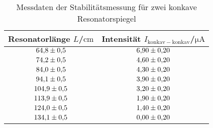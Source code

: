 \begin{table}
 \caption{Messdaten der Stabilitätsmessung für zwei konkave Resonatorspiegel}
 \label{tab:stabilitaetkk}
 \centering
{} \begin{tabular}{SS}
 \toprule 
    {Resonatorlänge $ L$/$\si{\centi\meter}$}& {Intensität $I_{\mathrm{konkav-konkav}}$/$\si{\micro\ampere}$} \\
     \midrule
     $\num{64.8 \pm 0.5}$ & $\num{6.90\pm0.20}$ \\
     $\num{74.2 \pm 0.5}$ & $\num{4.60\pm0.20}$ \\
     $\num{84.0 \pm 0.5}$ & $\num{4.30\pm0.20}$ \\
     $\num{94.1 \pm 0.5}$ & $\num{3.90\pm0.20}$ \\
     $\num{104.9 \pm 0.5}$ & $\num{3.20\pm0.20}$ \\
     $\num{113.9 \pm 0.5}$ & $\num{1.90\pm0.20}$ \\
     $\num{124.0 \pm 0.5}$ & $\num{1.40\pm0.20}$ \\
     $\num{134.1 \pm 0.5}$ & $\num{0.00\pm0.20}$ \\
 \bottomrule
 \end{tabular}
\end{table}